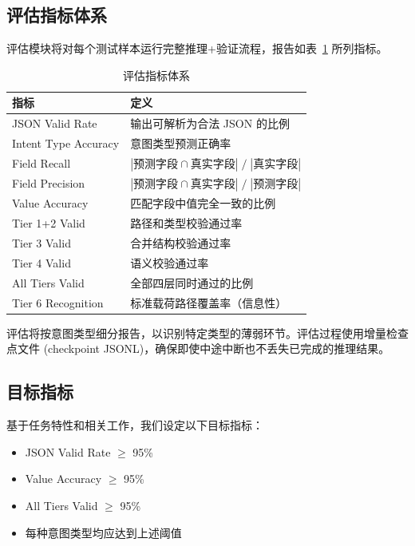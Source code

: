 \documentclass[12pt, a4paper]{article}
\begin{document}
\subsection{评估指标体系}

评估模块将对每个测试样本运行完整推理+验证流程，报告如表~\ref{tab:eval-metrics} 所列指标。

\begin{table}[H]
\centering
\caption{评估指标体系}
\label{tab:eval-metrics}
\small
\begin{tabular}{lp{9.5cm}}
\toprule
\textbf{指标} & \textbf{定义} \\
\midrule
JSON Valid Rate       & 输出可解析为合法 JSON 的比例 \\
Intent Type Accuracy  & 意图类型预测正确率 \\
Field Recall          & $|\text{预测字段} \cap \text{真实字段}| \;/\; |\text{真实字段}|$ \\
Field Precision       & $|\text{预测字段} \cap \text{真实字段}| \;/\; |\text{预测字段}|$ \\
Value Accuracy        & 匹配字段中值完全一致的比例 \\
Tier 1+2 Valid        & 路径和类型校验通过率 \\
Tier 3 Valid          & 合并结构校验通过率 \\
Tier 4 Valid          & 语义校验通过率 \\
All Tiers Valid       & 全部四层同时通过的比例 \\
Tier 6 Recognition    & 标准载荷路径覆盖率（信息性）\\
\bottomrule
\end{tabular}
\end{table}

\noindent
评估将按意图类型细分报告，以识别特定类型的薄弱环节。评估过程使用增量检查点文件 (checkpoint JSONL)，确保即使中途中断也不丢失已完成的推理结果。

\subsection{目标指标}

基于任务特性和相关工作，我们设定以下目标指标：

\begin{itemize}
  \item JSON Valid Rate $\geq$ 95\%
  \item Value Accuracy $\geq$ 95\%
  \item All Tiers Valid $\geq$ 95\%
  \item 每种意图类型均应达到上述阈值
\end{itemize}
\end{document}
